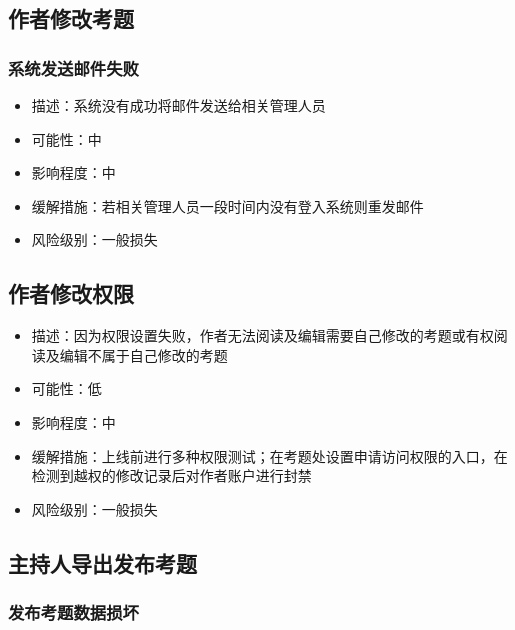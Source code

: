 \documentclass[hyperref, a4paper]{ctexart}
\providecommand{\tightlist}{%
  \setlength{\itemsep}{0pt}\setlength{\parskip}{0pt}}
\begin{document}
\hypertarget{ux4f5cux8005ux4feeux6539ux8003ux9898-1}{%
\subsection{作者修改考题}\label{ux4f5cux8005ux4feeux6539ux8003ux9898-1}}

\hypertarget{ux7cfbux7edfux53d1ux9001ux90aeux4ef6ux5931ux8d25-4}{%
\subsubsection{系统发送邮件失败}\label{ux7cfbux7edfux53d1ux9001ux90aeux4ef6ux5931ux8d25-4}}

\begin{itemize}
\tightlist
\item
  描述：系统没有成功将邮件发送给相关管理人员
\item
  可能性：中
\item
  影响程度：中
\item
  缓解措施：若相关管理人员一段时间内没有登入系统则重发邮件
\item
  风险级别：一般损失
\end{itemize}

\hypertarget{ux4f5cux8005ux4feeux6539ux6743ux9650-1}{%
\subsection{作者修改权限}\label{ux4f5cux8005ux4feeux6539ux6743ux9650-1}}

\begin{itemize}
\tightlist
\item
  描述：因为权限设置失败，作者无法阅读及编辑需要自己修改的考题或有权阅读及编辑不属于自己修改的考题
\item
  可能性：低
\item
  影响程度：中
\item
  缓解措施：上线前进行多种权限测试；在考题处设置申请访问权限的入口，在检测到越权的修改记录后对作者账户进行封禁
\item
  风险级别：一般损失
\end{itemize}

\hypertarget{ux4e3bux6301ux4ebaux5bfcux51faux53d1ux5e03ux8003ux9898-1}{%
\subsection{主持人导出发布考题}\label{ux4e3bux6301ux4ebaux5bfcux51faux53d1ux5e03ux8003ux9898-1}}

\hypertarget{ux53d1ux5e03ux8003ux9898ux6570ux636eux635fux574f}{%
\subsubsection{发布考题数据损坏}\label{ux53d1ux5e03ux8003ux9898ux6570ux636eux635fux574f}}
\end{document}
